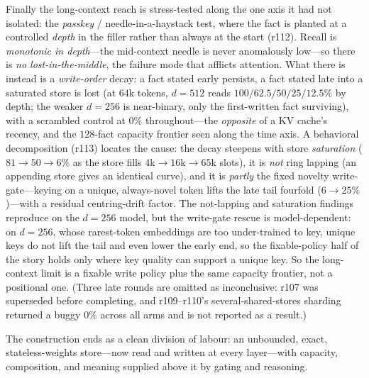 Finally the long-context reach is stress-tested along the one axis it had not isolated: the
\emph{passkey} / needle-in-a-haystack test, where the fact is planted at a controlled
\emph{depth} in the filler rather than always at the start (r112). Recall is \emph{monotonic
in depth}---the mid-context needle is never anomalously low---so there is \emph{no
lost-in-the-middle}, the failure mode that afflicts attention. What there is instead is a
\emph{write-order} decay: a fact stated early persists, a fact stated late into a saturated
store is lost (at $64$k tokens, $d{=}512$ reads $100/62.5/50/25/12.5\%$ by depth; the weaker
$d{=}256$ is near-binary, only the first-written fact surviving), with a scrambled control at
$0\%$ throughout---the \emph{opposite} of a KV cache's recency, and the $128$-fact capacity
frontier seen along the time axis. A behavioral decomposition (r113) locates the cause: the
decay steepens with store \emph{saturation} ($81\!\to\!50\!\to\!6\%$ as the store fills
$4$k$\to$$16$k$\to$$65$k slots), it is \emph{not} ring lapping (an appending store gives an
identical curve), and it is \emph{partly} the fixed novelty write-gate---keying on a unique,
always-novel token lifts the late tail fourfold ($6\!\to\!25\%$)---with a residual
centring-drift factor. The not-lapping and saturation findings reproduce on the $d{=}256$
model, but the write-gate rescue is model-dependent: on $d{=}256$, whose rarest-token
embeddings are too under-trained to key, unique keys do not lift the tail and even lower the
early end, so the fixable-policy half of the story holds only where key quality can support a
unique key. So the long-context limit is a fixable write policy plus the same
capacity frontier, not a positional one. (Three late rounds are omitted as inconclusive: r107
was superseded before completing, and r109--r110's several-shared-stores sharding returned a
buggy $0\%$ across all arms and is not reported as a result.)

The construction ends as a clean
division of labour: an unbounded, exact, stateless-weights store---now read and written at
every layer---with capacity, composition, and meaning supplied above it by gating and
reasoning.

